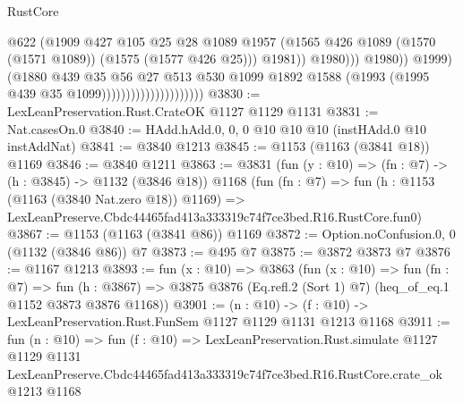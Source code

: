 \begin{lexlean}{RustCore}
\begin{coremodule}
                                                      @622
                                                      (@1909
                                                        @427
                                                        @105
                                                        @25
                                                        @28
                                                        @1089
                                                        @1957
                                                        (@1565
                                                          @426
                                                          @1089
                                                          (@1570 (@1571 @1089))
                                                          (@1575 (@1577 @426 @25)))
                                                        @1981))
                                                    @1980)))
                                              @1980))
                                          @1999)
                                        (@1880
                                          @439
                                          @35
                                          @56
                                          @27
                                          @513
                                          @530
                                          @1099
                                          @1892
                                          @1588
                                          (@1993 (@1995 @439 @35 @1099)))))))))))))))))))))
@3830 := LexLeanPreservation.Rust.CrateOK @1127 @1129 @1131
@3831 := Nat.casesOn.{0}
@3840 := HAdd.hAdd.{0, 0, 0} @10 @10 @10 (instHAdd.{0} @10 instAddNat)
@3841 := @3840 @1213
@3845 := @1153 (@1163 (@3841 @18)) @1169
@3846 := @3840 @1211
@3863 := @3831
    (fun (y : @10) => (fn : @7) -> (h : @3845) -> @1132 (@3846 @18))
    @1168
    (fun (fn : @7) =>
    fun (h : @1153 (@1163 (@3840 Nat.zero @18)) @1169) =>
    LexLeanPreserve.Cbdc44465fad413a333319c74f7ce3bed.R16.RustCore.fun0)
@3867 := @1153 (@1163 (@3841 @86)) @1169
@3872 := Option.noConfusion.{0, 0} (@1132 (@3846 @86)) @7
@3873 := @495 @7
@3875 := @3872 @3873 @7
@3876 := @1167 @1213
@3893 := fun (x : @10) =>
  @3863
    (fun (x : @10) =>
    fun (fn : @7) =>
    fun (h : @3867) =>
    @3875 @3876 (Eq.refl.{2} (Sort 1) @7) (heq_of_eq.{1} @1152 @3873 @3876 @1168))
@3901 := (n : @10) -> (f : @10) -> LexLeanPreservation.Rust.FunSem @1127 @1129 @1131 @1213 @1168
@3911 := fun (n : @10) =>
  fun (f : @10) =>
  LexLeanPreservation.Rust.simulate
    @1127
    @1129
    @1131
    LexLeanPreserve.Cbdc44465fad413a333319c74f7ce3bed.R16.RustCore.crate_ok
    @1213
    @1168
\end{coremodule}
\end{lexlean}
